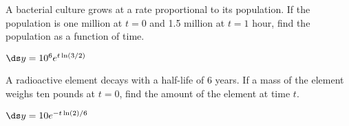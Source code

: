 \begin{exercises}
\begin{exercise} A bacterial culture grows at a rate proportional to its
population. If the population is one million at $t=0$ and 1.5
million at $t=1$ hour, find the population as a function of time.
\begin{answer} $\ds y=10^6e^{t\ln(3/2)}$
\end{answer}\end{exercise}

\begin{exercise} A radioactive element decays with a half-life of 6 years. If
a mass of the element weighs ten pounds at $t=0$, find the amount of
the element at time $t$.
\begin{answer} $\ds y=10e^{-t\ln(2)/6}$
\end{answer}\end{exercise}

\end{exercises}
